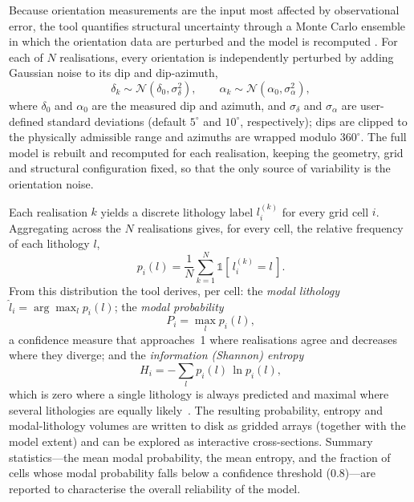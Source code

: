 \documentclass[11pt,a4paper]{article}
\begin{document}
Because orientation measurements are the input most affected by
observational error, the tool quantifies structural uncertainty through a
Monte Carlo ensemble in which the orientation data are perturbed and the
model is recomputed \cite{wellmann}. For each of $N$ realisations,
every orientation is independently perturbed by adding Gaussian noise to
its dip and dip-azimuth,
%
\begin{equation}
\delta_k \sim \mathcal{N}\!\left(\delta_0,\sigma_\delta^2\right),
\qquad
\alpha_k \sim \mathcal{N}\!\left(\alpha_0,\sigma_\alpha^2\right),
\end{equation}
%
where $\delta_0$ and $\alpha_0$ are the measured dip and azimuth, and
$\sigma_\delta$ and $\sigma_\alpha$ are user-defined standard deviations
(default $5^\circ$ and $10^\circ$, respectively); dips are
clipped to the physically admissible range and azimuths are wrapped modulo
$360^\circ$. The full model is rebuilt and recomputed for each
realisation, keeping the geometry, grid and structural configuration
fixed, so that the only source of variability is the orientation noise.

Each realisation $k$ yields a discrete lithology label $l_i^{(k)}$ for
every grid cell $i$. Aggregating across the $N$ realisations gives, for
every cell, the relative frequency of each lithology $l$,
%
\begin{equation}
p_i(l) = \frac{1}{N}\sum_{k=1}^{N}
\mathbb{1}\!\left[\,l_i^{(k)} = l\,\right].
\end{equation}
%
From this distribution the tool derives, per cell: the \emph{modal
lithology} $\hat{l}_i = \arg\max_l p_i(l)$; the \emph{modal probability}
%
\begin{equation}
P_i = \max_l p_i(l),
\end{equation}
%
a confidence measure that approaches~1 where realisations agree and
decreases where they diverge; and the \emph{information (Shannon) entropy}
%
\begin{equation}
H_i = -\sum_{l} p_i(l)\,\ln p_i(l),
\end{equation}
%
which is zero where a single lithology is always predicted and maximal
where several lithologies are equally likely~\cite{ref-wellmann}. The
resulting probability, entropy and modal-lithology volumes are written to
disk as gridded arrays (together with the model extent) and can be
explored as interactive cross-sections. Summary statistics---the mean
modal probability, the mean entropy, and the fraction of cells whose modal
probability falls below a confidence threshold ($0.8$)---are reported to
characterise the overall reliability of the model.
\end{document}
